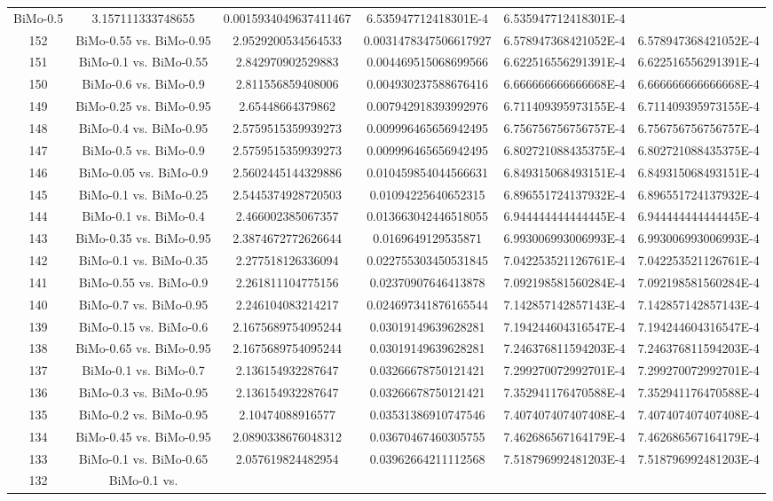 \documentclass[a4paper,10pt]{article}
\begin{document}
\begin{landscape}
\begin{table}[!htp]
\begin{tabular}{cccccc}
BiMo-0.5&3.157111333748655&0.0015934049637411467&6.535947712418301E-4&6.535947712418301E-4\\152&BiMo-0.55 vs. BiMo-0.95&2.9529200534564533&0.0031478347506617927&6.578947368421052E-4&6.578947368421052E-4\\151&BiMo-0.1 vs. BiMo-0.55&2.842970902529883&0.004469515068699566&6.622516556291391E-4&6.622516556291391E-4\\150&BiMo-0.6 vs. BiMo-0.9&2.811556859408006&0.004930237588676416&6.666666666666668E-4&6.666666666666668E-4\\149&BiMo-0.25 vs. BiMo-0.95&2.65448664379862&0.007942918393992976&6.711409395973155E-4&6.711409395973155E-4\\148&BiMo-0.4 vs. BiMo-0.95&2.5759515359939273&0.009996465656942495&6.756756756756757E-4&6.756756756756757E-4\\147&BiMo-0.5 vs. BiMo-0.9&2.5759515359939273&0.009996465656942495&6.802721088435375E-4&6.802721088435375E-4\\146&BiMo-0.05 vs. BiMo-0.9&2.5602445144329886&0.010459854044566631&6.849315068493151E-4&6.849315068493151E-4\\145&BiMo-0.1 vs. BiMo-0.25&2.5445374928720503&0.01094225640652315&6.896551724137932E-4&6.896551724137932E-4\\144&BiMo-0.1 vs. BiMo-0.4&2.466002385067357&0.013663042446518055&6.944444444444445E-4&6.944444444444445E-4\\143&BiMo-0.35 vs. BiMo-0.95&2.3874672772626644&0.0169649129535871&6.993006993006993E-4&6.993006993006993E-4\\142&BiMo-0.1 vs. BiMo-0.35&2.277518126336094&0.022755303450531845&7.042253521126761E-4&7.042253521126761E-4\\141&BiMo-0.55 vs. BiMo-0.9&2.261811104775156&0.02370907646413878&7.092198581560284E-4&7.092198581560284E-4\\140&BiMo-0.7 vs. BiMo-0.95&2.246104083214217&0.024697341876165544&7.142857142857143E-4&7.142857142857143E-4\\139&BiMo-0.15 vs. BiMo-0.6&2.1675689754095244&0.03019149639628281&7.194244604316547E-4&7.194244604316547E-4\\138&BiMo-0.65 vs. BiMo-0.95&2.1675689754095244&0.03019149639628281&7.246376811594203E-4&7.246376811594203E-4\\137&BiMo-0.1 vs. BiMo-0.7&2.136154932287647&0.03266678750121421&7.299270072992701E-4&7.299270072992701E-4\\136&BiMo-0.3 vs. BiMo-0.95&2.136154932287647&0.03266678750121421&7.352941176470588E-4&7.352941176470588E-4\\135&BiMo-0.2 vs. BiMo-0.95&2.10474088916577&0.03531386910747546&7.407407407407408E-4&7.407407407407408E-4\\134&BiMo-0.45 vs. BiMo-0.95&2.0890338676048312&0.03670467460305755&7.462686567164179E-4&7.462686567164179E-4\\133&BiMo-0.1 vs. BiMo-0.65&2.057619824482954&0.03962664211112568&7.518796992481203E-4&7.518796992481203E-4\\132&BiMo-0.1 vs. 
\end{tabular}
\end{table}
\end{landscape}
\end{document}
